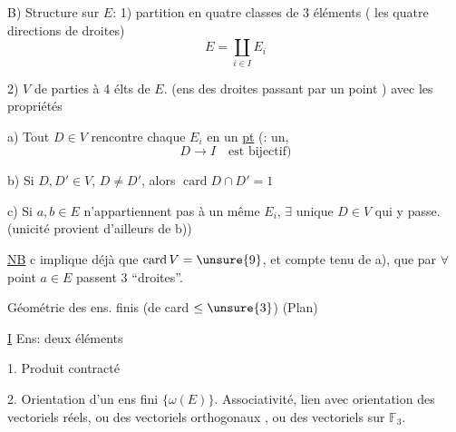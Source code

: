 
B) Structure sur $E$: 1) partition en quatre classes de 3 éléments ( les quatre directions de droites)
\[
E=\coprod_{i\in I}E_i
\]

2)  $V$ de parties à 4 élts de $E$. (ens des droites passant par un point ) avec les propriétés

a) Tout  $D\in V$ rencontre chaque $E_i$ en  un \uline{pt} (:  un,   
\[
D\longrightarrow I\quad\text{est bijectif})
\]

b) Si $D,D'\in V$, $D\neq D'$, alors $\operatorname{card}D\cap D'=1$


c) Si $a,b\in E$ n'appartiennent pas à un même $E_i$, $\exists$ unique $D\in V$ qui y passe. (unicité provient d'ailleurs de b))


\uline{NB} c implique déjà que $\operatorname{card}V=\unsure{9}$, et compte tenu de a), que par $\forall$ point $a\in E$ passent  3 ``droites''.


Géométrie des ens. finis (de card $\leq\unsure{3}$) \hfill (Plan)

\uline{I} Ens: deux éléments

1. Produit contracté


2. Orientation d'un ens fini $\{\omega(E)\}$. Associativité, lien avec orientation des vectoriels réels, ou des vectoriels orthogonaux , ou des vectoriels sur $\mathbb F_3$.

